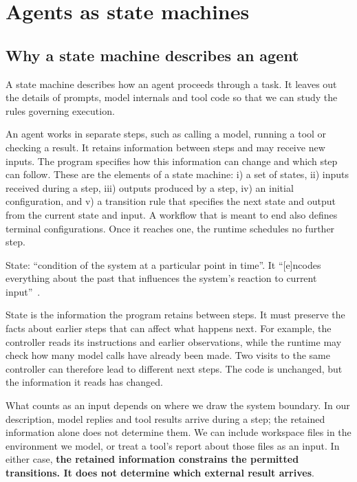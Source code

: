 \section{Agents as state machines}
\label{sec:efsm}

\subsection{Why a state machine describes an agent}
\label{sec:efsm-why}

A state machine describes how an agent proceeds through a task. It leaves out the details of
prompts, model internals and tool code so that we can study the rules governing execution.

An agent works in separate steps, such as calling a model, running a tool or checking a result.
It retains information between steps and may receive new inputs. The program specifies how this
information can change and which step can follow. These are the elements of a state machine:
i) a set of states, ii) inputs received during a step, iii) outputs produced by a step, iv) an
initial configuration, and v) a transition rule that specifies the next state and output from
the current state and input. A workflow that is meant to end also defines terminal
configurations. Once it reaches one, the runtime schedules no further step.

\begin{definition}[State]
\label{def:state}
State: ``condition of the system at a particular point in time''. It ``[e]ncodes everything about
the past that influences the system's reaction to current input''~\citep[slide~10]{seshia2015discrete}.
\end{definition}

State is the information the program retains between steps. It must preserve the facts about
earlier steps that can affect what happens next. For example, the controller reads its
instructions and earlier observations, while the runtime may check how many model calls have
already been made. Two visits to the same controller can therefore lead to different next
steps. The code is unchanged, but the information it reads has changed.

What counts as an input depends on where we draw the system boundary. In our description,
model replies and tool results arrive during a step; the retained information alone does not
determine them. We can include workspace files in the environment we model, or treat a tool's
report about those files as an input. In either case, \textbf{the retained information constrains
the permitted transitions. It does not determine which external result arrives}.

